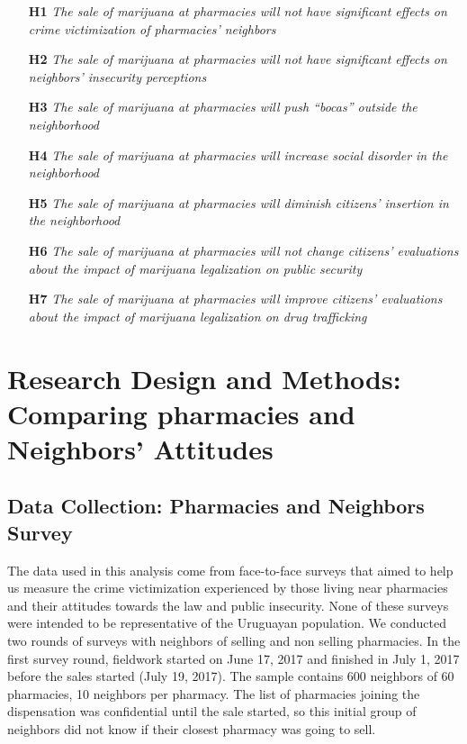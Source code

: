 \documentclass[11pt]{article}
\begin{document}
\begin{itemize}
\item [\textbf{H1}] \textit{The sale of marijuana at pharmacies will not have significant effects on crime victimization of pharmacies' neighbors}

\item [\textbf{H2}] \textit{The sale of marijuana at pharmacies will not have significant effects on neighbors' insecurity perceptions}

\item [\textbf{H3}] \textit{The sale of marijuana at pharmacies will push ``bocas'' outside the neighborhood}

\item [\textbf{H4}] \textit{The sale of marijuana at pharmacies will increase social disorder in the neighborhood}

\item [\textbf{H5}] \textit{The sale of marijuana at pharmacies will diminish citizens' insertion in the neighborhood}

\item [\textbf{H6}] \textit{The sale of marijuana at pharmacies will not change citizens' evaluations about the impact of marijuana legalization on public security}

\item [\textbf{H7}] \textit{The sale of marijuana at pharmacies will improve citizens' evaluations about the impact of marijuana legalization on drug trafficking}

\end{itemize}

\section{Research Design and Methods: Comparing pharmacies and Neighbors' Attitudes}
\subsection{Data Collection: Pharmacies and Neighbors Survey}
The data used in this analysis come from face-to-face surveys that aimed to help us measure the crime victimization experienced by those living near pharmacies and their attitudes towards the law and public insecurity. None of these surveys were intended to be representative of the Uruguayan population. We conducted two rounds of surveys with neighbors of selling and non selling pharmacies. In the first survey round, fieldwork started on June 17, 2017 and finished in July 1, 2017 before the sales started (July 19, 2017). The sample contains 600 neighbors of 60 pharmacies, 10 neighbors per pharmacy. The list of pharmacies joining the dispensation was confidential until the sale started, so this initial group of neighbors did not know if their closest pharmacy was going to sell.
\end{document}
